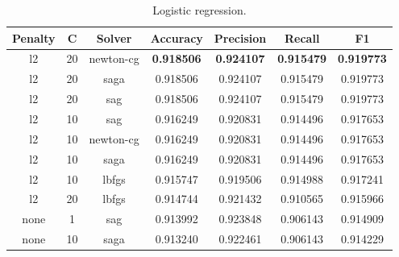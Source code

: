 \begin{appendices}
\begin{table}[ht]
\begin{subtable}{\textwidth}
\begin{adjustbox}{minipage=18cm, center}
\begin{tabular*}{\textwidth}{c @{\extracolsep{\fill}} cccccc}
\toprule
Penalty &   C &     Solver &  Accuracy &  Precision &    Recall &        F1 \\
\midrule
     l2 &  20 &  newton-cg &  \textbf{0.918506} &   \textbf{0.924107} &  \textbf{0.915479} &  \textbf{0.919773} \\
     l2 &  20 &       saga &  0.918506 &   0.924107 &  0.915479 &  0.919773 \\
     l2 &  20 &        sag &  0.918506 &   0.924107 &  0.915479 &  0.919773 \\
     l2 &  10 &        sag &  0.916249 &   0.920831 &  0.914496 &  0.917653 \\
     l2 &  10 &  newton-cg &  0.916249 &   0.920831 &  0.914496 &  0.917653 \\
     l2 &  10 &       saga &  0.916249 &   0.920831 &  0.914496 &  0.917653 \\
     l2 &  10 &      lbfgs &  0.915747 &   0.919506 &  0.914988 &  0.917241 \\
     l2 &  20 &      lbfgs &  0.914744 &   0.921432 &  0.910565 &  0.915966 \\
   none &   1 &        sag &  0.913992 &   0.923848 &  0.906143 &  0.914909 \\
   none &  10 &       saga &  0.913240 &   0.922461 &  0.906143 &  0.914229 \\
\bottomrule

\end{tabular*}
\caption{\label{tab:Logistic regression}Logistic regression.}
\end{adjustbox}
\end{subtable}



\end{table}
\end{appendices}
